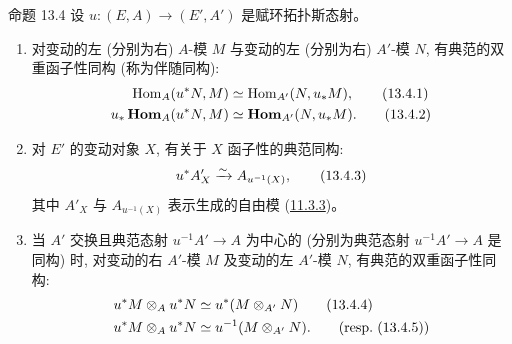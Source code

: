 \begin{enonce*}{命题 13.4}
设 $u:(E,A)\rightarrow(E',A')$ 是赋环拓扑斯态射。
\begin{enumerate}
\renewcommand{\theenumi}{\alph{enumi}}
\renewcommand{\labelenumi}{\theenumi)}
\item 对变动的左 (分别为右) $A$-模 $M$ 与变动的左 (分别为右) $A'$-模 $N$, 有典范的双重函子性同构 (称为伴随同构):
\hypertarget{sga4.exp.IV.equation.13.4.1}{}\begin{align*}
\operatorname{Hom}_A(u^{\ast}N,M) &\simeq
\operatorname{Hom}_{A'}(N,u_{\ast}M){},\tag{13.4.1}\\
u_{\ast}\operatorname{\mathbf{Hom}}_A(u^{\ast}N,M) &\simeq
\operatorname{\mathbf{Hom}}_{A'}(N,u_{\ast}M){}.\tag{13.4.2}
\end{align*}\hypertarget{sga4.exp.IV.equation.13.4.2}{}

\item 对 $E'$ 的变动对象 $X$, 有关于 $X$ 函子性的典范同构:
\begin{equation*}
u^{\ast}A'_X\xrightarrow{\sim} A_{u^{-1}(X)}{},\tag{13.4.3}
\end{equation*}
其中 $A'_X$ 与 $A_{u^{-1}(X)}$ 表示生成的自由模 (\hyperref[IV.prop11.3.3]{11.3.3})。

\item 当 $A'$ 交换且典范态射 $u^{-1}A'\rightarrow A$ 为中心的 (分别为典范态射 $u^{-1}A'\rightarrow A$ 是同构) 时, 对变动的右 $A'$-模 $M$ 及变动的左 $A'$-模 $N$, 有典范的双重函子性同构:
\hypertarget{sga4.exp.IV.equation.13.4.4}{}\begin{align*}
u^{\ast}M\otimes_A u^{\ast}N &\simeq
u^{\ast}(M\otimes_{A'}N)\tag{13.4.4}\\
u^{\ast}M\otimes_A u^{\ast}N &\simeq
u^{-1}(M\otimes_{A'}N){\quoi}.\tag*{(\resp (13.4.5))}
\end{align*}\hypertarget{sga4.exp.IV.equation.13.4.5}{}
\end{enumerate}
\end{enonce*}


